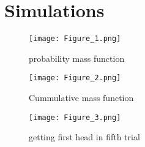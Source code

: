 \documentclass[journel,12pt,twocoloums]{IEEEtran}
\begin{document}
\section{Simulations}
\begin{figure}[!htb]
    \centering
    \texttt{[image: Figure\_1.png]}
    \caption{probability mass function}
    \label{fig:my_label}
\end{figure}
\begin{figure}[!htb]
    \centering
    \texttt{[image: Figure\_2.png]}
    \caption{Cummulative mass function}
    \label{fig:my_label}
\end{figure}
\begin{figure}[!htb]
    \centering
    \texttt{[image: Figure\_3.png]}
    \caption{getting first head in fifth trial}
    \label{fig:my_label}
\end{figure}
\end{document}
